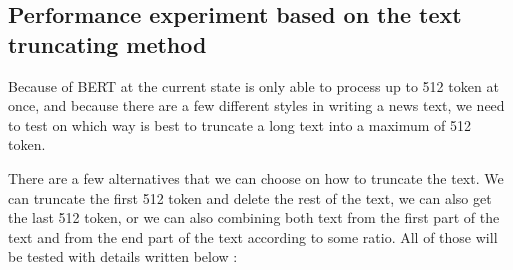 \subsection{Performance experiment based on the text truncating method}

Because of BERT at the current state is only able to process up to 512 token at once, and because there are a few different styles in writing a news text, we need to test on which way is best to truncate a long text into a maximum of 512 token.

There are a few alternatives that we can choose on how to truncate the text. We can truncate the first 512 token and delete the rest of the text, we can also get the last 512 token, or we can also combining both text from the first part of the text and from the end part of the text according to some ratio. All of those will be tested with details written below :

